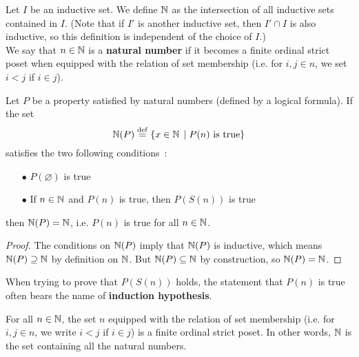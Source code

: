 \begin{definition} \label{natural-numbers}
    Let $I$ be an inductive set. We define $\operatorname{\mathbb N}$ as the intersection of all inductive sets contained in $I$. (Note that if $I'$ is another inductive set, then $I' \cap I$ is also inductive, so this definition is independent of the choice of $I$.)
    \\

    We say that $n \in \operatorname{\mathbb N}$ is a \textbf{natural number} if it becomes a finite ordinal strict poset when equipped with the relation of set membership (i.e. for $i,j \in n$, we set $i < j$ if $i \in j$).
\end{definition}

\begin{theorem} \label{weak-induction-on-natural-numbers}
    Let $P$ be a property satisfied by natural numbers (defined by a logical formula). If the set 
    \[
        \operatorname{\mathbb N}(P) \overset{\mathrm{def}}{=} \{ x \in \operatorname{\mathbb N} \, \mid P(n) \text{ is true} \}    
    \]
    satisfies the two following conditions~:
    \begin{itemize}
        \item[$\bullet$] $P(\varnothing)$ is true
        \item[$\bullet$] If $n \in \operatorname{\mathbb N}$ and $P(n)$ is true, then $P(S(n))$ is true
    \end{itemize}
    then $\operatorname{\mathbb N}(P) = \operatorname{\mathbb N}$, i.e. $P(n)$ is true for all $n \in \operatorname{\mathbb N}$.
\end{theorem}

\begin{proof}
    The conditions on $\operatorname{\mathbb N}(P)$ imply that $\operatorname{\mathbb N}(P)$ is inductive, which means $\operatorname{\mathbb N}(P) \supseteq \operatorname{\mathbb N}$ by definition on $\operatorname{\mathbb N}$. But $\operatorname{\mathbb N}(P) \subseteq \operatorname{\mathbb N}$ by construction, so $\operatorname{\mathbb N}(P) = \operatorname{\mathbb N}$. 
\end{proof}

\begin{remark}
    When trying to prove that $P(S(n))$ holds, the statement that $P(n)$ is true often bears the name of \textbf{induction hypothesis}.
\end{remark}

\begin{lemma} \label{natural-numbers-are-finite-ordinals}
    For all $n \in \operatorname{\mathbb N}$, the set $n$ equipped with the relation of set membership (i.e. for $i,j \in n$, we write $i < j$ if $i \in j$) is a finite ordinal strict poset. In other words, $\operatorname{\mathbb N}$ is the set containing all the natural numbers.
\end{lemma}

